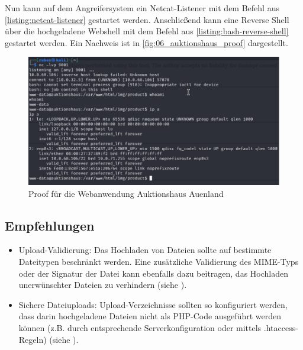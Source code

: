 Nun kann auf dem Angreifersystem ein Netcat-Listener mit dem Befehl aus \autoref{listing:netcat-listener} gestartet werden. Anschließend kann eine Reverse Shell über die hochgeladene Webshell mit dem Befehl aus \autoref{listing:bash-reverse-shell} gestartet werden. Ein Nachweis ist in \autoref{fig:06_auktionshaus_proof} dargestellt.


\begin{figure}[!ht]
    \centering
    \includegraphics[width=\linewidth]{images/proofs/06_auktionshaus_proof.png}
    \caption{Proof für die Webanwendung Auktionshaus Auenland}
    \label{fig:06_auktionshaus_proof}
\end{figure}

\subsection*{Empfehlungen}
\begin{itemize}
    \item Upload-Validierung: Das Hochladen von Dateien sollte auf bestimmte Dateitypen beschränkt werden. Eine zusätzliche Validierung des MIME-Typs oder der Signatur der Datei kann ebenfalls dazu beitragen, das Hochladen unerwünschter Dateien zu verhindern (siehe \cite{owaspFileUpload}).
    \item Sichere Dateiuploads: Upload-Verzeichnisse sollten so konfiguriert werden, dass darin hochgeladene Dateien nicht als PHP-Code ausgeführt werden können (z.B. durch entsprechende Serverkonfiguration oder mittels .htaccess-Regeln) (siehe \cite{owaspFileUpload}).
\end{itemize}
